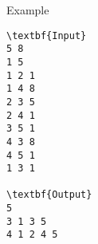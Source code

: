 Example
\begin{verbatim}
\textbf{Input}
5 8
1 5
1 2 1
1 4 8
2 3 5
2 4 1
3 5 1
4 3 8
4 5 1
1 3 1

\textbf{Output}
5
3 1 3 5 
4 1 2 4 5
\end{verbatim}